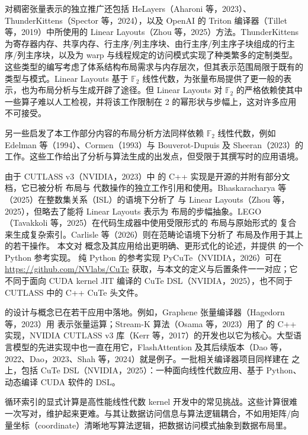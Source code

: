 对稠密张量表示的独立推广还包括 HeLayers（Aharoni 等，2023）、ThunderKittens（Spector 等，2024），以及 OpenAI 的 Triton 编译器（Tillet 等，2019）中所使用的 Linear Layouts（Zhou 等，2025）方法。ThunderKittens 为寄存器内存、共享内存、行主序/列主序块、由行主序/列主序子块组成的行主序/列主序块，以及为 warp 与线程规定的访问模式实现了种类繁多的定制类型。这些类型的编写考虑了体系结构布局需求与内存层次，但其表示范围局限于既有的类型与模式。Linear Layouts 基于 $\mathbb{F}_2$ 线性代数，为张量布局提供了更一般的表示，也为布局分析与生成开辟了途径。但 Linear Layouts 对 $\mathbb{F}_2$ 的严格依赖使其中一些算子难以人工检视，并将该工作限制在 2 的幂形状与步幅上，这对许多应用不可接受。

另一些启发了本工作部分内容的布局分析方法同样依赖 $\mathbb{F}_2$ 线性代数，例如 Edelman 等（1994）、Cormen（1993）与 Bouverot-Dupuis 及 Sheeran（2023）的工作。这些工作给出了分析与算法生成的出发点，但受限于其撰写时的应用语境。

由于 CUTLASS v3（NVIDIA，2023）中 \CuTe 的 C++ 实现是开源的并附有部分文档，它已被分析 \CuTe 布局与 \CuTe 代数操作的独立工作引用和使用。Bhaskaracharya 等（2025）在整数集关系（ISL）的语境下分析了 \CuTe 与 Linear Layouts（Zhou 等，2025），但略去了能将 Linear Layouts 表示为 \CuTe 布局的步幅抽象。LEGO（Tavakkoli 等，2025）在代码生成器中使用受限形式的 \CuTe 布局与原始形式的 \CuTe 复合来生成复杂索引。Carlisle 等（2026）则在范畴论语境下分析了 \CuTe 布局及作用于其上的若干操作。
本文对 \CuTe 概念及其应用给出更明确、更形式化的论述，并提供 \CuTe 的一个 Python 参考实现。
纯 Python 的参考实现 PyCuTe（NVIDIA，2026）可在 \url{https://github.com/NVlabs/CuTe} 获取，与本文的定义与后置条件一一对应；它不同于面向 CUDA kernel JIT 编译的 CuTe DSL（NVIDIA，2025），也不同于 CUTLASS 中的 C++ CuTe 头文件。

\CuTe 的设计与概念已在若干应用中落地。例如，Graphene 张量编译器（Hagedorn 等，2023）用 \CuTe 表示张量运算；Stream-K 算法（Osama 等，2023）用了 \CuTe 的 C++ 实现，NVIDIA CUTLASS v3 库（Kerr 等，2017）的开发也以它为核心。大型语言模型的先进实现中也一直在用它，FlashAttention 及其后续版本（Dao 等，2022、Dao，2023、Shah 等，2024）就是例子。一批相关编译器项目同样建在 \CuTe 之上，包括 CuTe DSL（NVIDIA，2025）：一种面向线性代数应用、基于 Python、动态编译 CUDA 软件的 DSL。

\label{sec:loops}

循环索引的显式计算是高性能线性代数 kernel 开发中的常见挑战。这些计算很难一次写对，维护起来更难。与其让数据访问信息与算法逻辑耦合，不如用矩阵/向量坐标（coordinate）清晰地写算法逻辑，把数据访问模式抽象到数据布局里。


